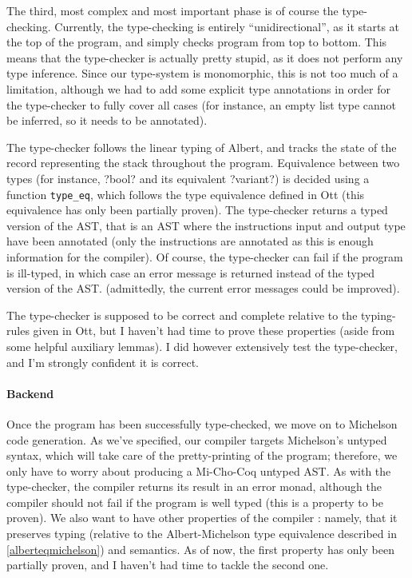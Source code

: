 \documentclass{report}
\begin{document}
The third, most complex and most important phase is of course the type-checking. Currently, the type-checking is entirely ``unidirectional'', as it starts at the top of the program, and simply checks program from top to bottom. This means that the type-checker is actually pretty stupid, as it does not perform any type inference. Since our type-system is monomorphic, this is not too much of a limitation, although we had to add some explicit type annotations in order for the type-checker to fully cover all cases (for instance, an empty list type cannot be inferred, so it needs to be annotated).

The type-checker follows the linear typing of Albert, and tracks the state of the record representing the stack throughout the program. Equivalence between two types (for instance, ?bool? and its equivalent ?variant?) is decided using a function \texttt{type\_eq}, which follows the type equivalence defined in Ott (this equivalence has only been partially proven). The type-checker returns a typed version of the AST, that is an AST where the instructions input and output type have been annotated (only the instructions are annotated as this is enough information for the compiler). Of course, the type-checker can fail if the program is ill-typed, in which case an error message is returned instead of the typed version of the AST. (admittedly, the current error messages could be improved).

The type-checker is supposed to be correct and complete relative to the typing-rules given in Ott, but I haven't had time to prove these properties (aside from some helpful auxiliary lemmas). I did however extensively test the type-checker, and I'm strongly confident it is correct.

\paragraph{Backend}

Once the program has been successfully type-checked, we move on to Michelson code generation. As we've specified, our compiler targets Michelson's untyped syntax, which will take care of the pretty-printing of the program; therefore, we only have to worry about producing a Mi-Cho-Coq untyped AST. As with the type-checker, the compiler returns its result in an error monad, although the compiler should not fail if the program is well typed (this is a property to be proven). We also want to have other properties of the compiler : namely, that it preserves typing (relative to the Albert-Michelson type equivalence described in \ref{alberteqmichelson}) and semantics. As of now, the first property has only been partially proven, and I haven't had time to tackle the second one.
\end{document}
